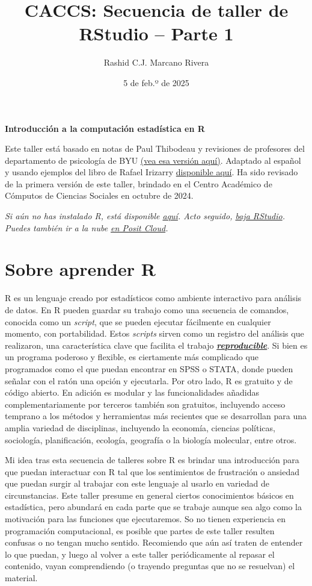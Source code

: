 \documentclass[
]{article}
\title{CACCS: Secuencia de taller de RStudio -- Parte 1}
\author{Rashid C.J. Marcano Rivera}
\date{5 de feb.º de 2025}
\begin{document}
\maketitle

{
\setcounter{tocdepth}{2}
\tableofcontents
}
\textbf{Introducción a la computación estadística en R}

Este taller está basado en notas de Paul Thibodeau y revisiones de
profesores del departamento de psicología de BYU
\href{https://fhssrsc.byu.edu/r-workshop}{(vea esa versión aquí)}.
Adaptado al español y usando ejemplos del libro de Rafael Irizarry
\href{https://leanpub.com/dslibro}{disponible aquí}. Ha sido revisado de
la primera versión de este taller, brindado en el Centro Académico de
Cómputos de Ciencias Sociales en octubre de 2024.

\emph{Si aún no has instalado R, está disponible
\href{http://cran.us.r-project.org/}{aquí}. Acto seguido,
\href{https://posit.co/download/rstudio-desktop/}{baja RStudio}. Puedes
también ir a la nube \href{https://posit.cloud/}{en Posit Cloud}.}

\section{Sobre aprender R}\label{sobre-aprender-r}

R es un lenguaje creado por estadísticos como ambiente interactivo para
análisis de datos. En R pueden guardar su trabajo como una secuencia de
comandos, conocida como un \emph{script}, que se pueden ejecutar
fácilmente en cualquier momento, con portabilidad. Estos \emph{scripts}
sirven como un registro del análisis que realizaron, una característica
clave que facilita el trabajo \ul{\textbf{\emph{reproducible}}}. Si bien
es un programa poderoso y flexible, es ciertamente más complicado que
programados como el que puedan encontrar en SPSS o STATA, donde pueden
señalar con el ratón una opción y ejecutarla. Por otro lado, R es
gratuito y de código abierto. En adición es modular y las
funcionalidades añadidas complementariamente por terceros también son
gratuitos, incluyendo acceso temprano a los métodos y herramientas más
recientes que se desarrollan para una amplia variedad de disciplinas,
incluyendo la economía, ciencias políticas, sociología, planificación,
ecología, geografía o la biología molecular, entre otros.

Mi idea tras esta secuencia de talleres sobre R es brindar una
introducción para que puedan interactuar con R tal que los sentimientos
de frustración o ansiedad que puedan surgir al trabajar con este
lenguaje al usarlo en variedad de circunstancias. Este taller presume en
general ciertos conocimientos básicos en estadística, pero abundará en
cada parte que se trabaje aunque sea algo como la motivación para las
funciones que ejecutaremos. So no tienen experiencia en programación
computacional, es posible que partes de este taller resulten confusas o
no tengan mucho sentido. Recomiendo que aún así traten de entender lo
que puedan, y luego al volver a este taller periódicamente al repasar el
contenido, vayan comprendiendo (o trayendo preguntas que no se
resuelvan) el material.
\end{document}
